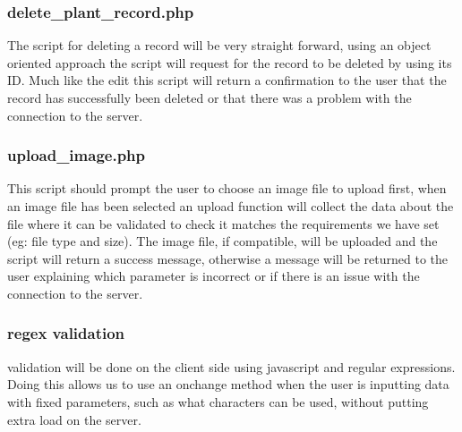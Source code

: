 	\subsubsection{delete\_plant\_record.php}
		The script for deleting a record will be very straight forward, using an object oriented approach the script will request for the record to be deleted by using its ID. Much like the edit this script will return a confirmation to the user that the record has successfully been deleted or that there was a problem with the connection to the server.

	\subsubsection{upload\_image.php}
		This script should prompt the user to choose an image file to upload first, when an image file has been selected an upload function will collect the data about the file where it can be validated to check it matches the requirements we have set (eg: file type and size). The image file, if compatible, will be uploaded and the script will return a success message, otherwise a message will be returned to the user explaining which parameter is incorrect or if there is an issue with the connection to the server.

	\subsubsection{regex validation}
		validation will be done on the client side using javascript and regular expressions. Doing this allows us to use an onchange method when the user is inputting data with fixed parameters, such as what characters can be used, without putting extra load on the server.
